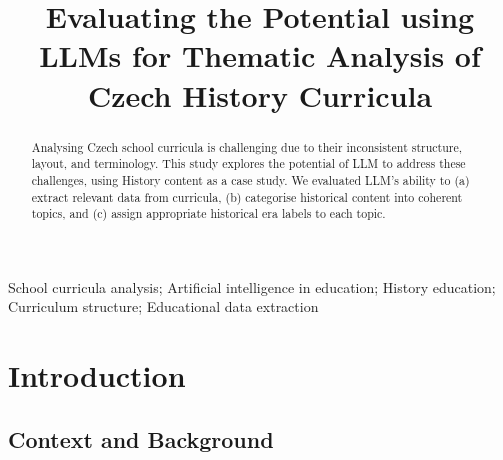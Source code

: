\documentclass[]{interact}
\theoremstyle{plain}%
\theoremstyle{definition}
\theoremstyle{remark}
\begin{document}

\title{Evaluating the Potential using LLMs for Thematic Analysis of Czech History Curricula}

\author{
}


\maketitle

\begin{abstract}
Analysing Czech school curricula is challenging due to their inconsistent structure, layout, and terminology. This study explores the potential of LLM to address these challenges, using History content as a case study. We evaluated LLM's ability to (a) extract relevant data from curricula, (b) categorise historical content into coherent topics, and (c) assign appropriate historical era labels to each topic.

\end{abstract}

\begin{keywords}
School curricula analysis;
Artificial intelligence in education;
History education;
Curriculum structure;
Educational data extraction

\end{keywords}


\section{Introduction}





\subsection{Context and Background}
\end{document}

